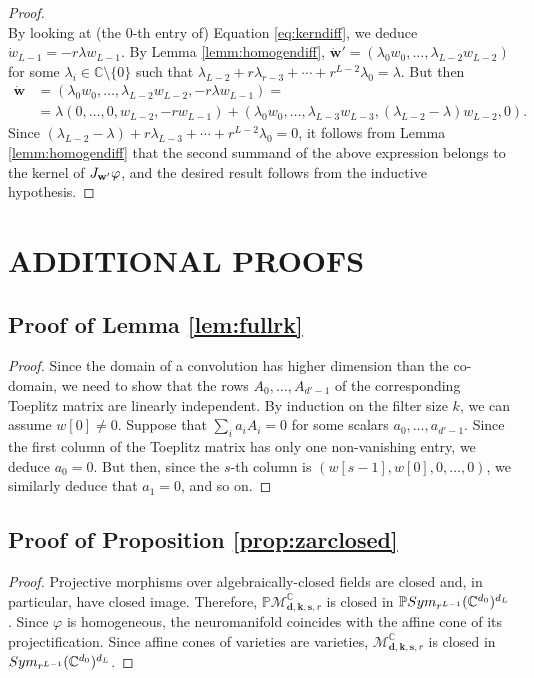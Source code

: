 \documentclass[twoside]{article}
\theoremstyle{plain}%
\theoremstyle{definition}
\theoremstyle{remark}
\newcommand{\symmm}[2]{\textnormal{Sym}_{#1}(#2)}
\begin{document}
\begin{proof}
\begin{equation}
\end{equation}
By looking at (the $0$-th entry of) Equation \ref{eq:kerndiff}, we deduce $\dot{w}_{L-1} = -r \lambda w_{L-1}$. By Lemma \ref{lemm:homogendiff}, $\dot{\mathbf{w}}' = (\lambda_{0}w_{0}, \ldots, \lambda_{L-2}w_{L-2})$ for some $\lambda_i \in \mathbb{C} \setminus \{0\}$ such that $\lambda_{L-2} + r \lambda_{r-3} + \cdots + r^{L-2} \lambda_0 = \lambda$. But then
\begin{align}
\dot{\mathbf{w}} &= (\lambda_0 w_0, \ldots,  \lambda_{L-2}w_{L-2}, -r \lambda w_{L-1}) = \\
&= \lambda (0, \ldots, 0, w_{L-2}, -rw_{L-1}) + (\lambda_{0} w_0, \ldots, \lambda_{L-3}w_{L-3}, (\lambda_{L-2} - \lambda)w_{L-2}, 0).
\end{align}
Since $(\lambda_{L-2} - \lambda) + r \lambda_{L-3} + \cdots + r^{L-2}\lambda_0 = 0$, it follows from Lemma \ref{lemm:homogendiff} that the second summand of the above expression belongs to the kernel of $ \textnormal{J}_\mathbf{w'} \varphi$, and the desired result follows from the inductive hypothesis.
\end{proof}



\section{ADDITIONAL PROOFS}\label{sec:remproof}
\subsection{Proof of Lemma \ref{lem:fullrk}}\label{app:fullrk}
\begin{proof}
Since the domain of a convolution has higher dimension than the co-domain, we need to show that the rows $A_0, \ldots, A_{d'-1}$ of the corresponding Toeplitz matrix are linearly independent. By induction on the filter size $k$, we can assume $w[0] \not = 0$. Suppose that $\sum_i a_i A_i = 0$ for some scalars $a_0, \ldots, a_{d'-1}$. Since the first column of the Toeplitz matrix has only one non-vanishing entry, we deduce $a_0 = 0$. But then, since the $s$-th column is $(w[s-1], w[0], 0, \ldots, 0)$, we similarly deduce that $a_1 = 0$, and so on. 
\end{proof}

\subsection{Proof of Proposition \ref{prop:zarclosed}}\label{app:zarclosed}
\begin{proof}
Projective morphisms over algebraically-closed fields are closed \parencite[II, \S 4, Theorem 4.9]{hartshorne2013algebraic} and, in particular, have closed image. Therefore, $\mathbb{P}\mathcal{M}_{\mathbf{d}, \mathbf{k}, \mathbf{s}, r}^\mathbb{C}$ is closed in $\mathbb{P} \symmm{r^{L-1}}{\mathbb{C}^{d_0}}^{d_L}$. Since $\varphi$ is homogeneous, the neuromanifold coincides with the affine cone of its projectification. Since affine cones of varieties are varieties, $\mathcal{M}_{\mathbf{d}, \mathbf{k}, \mathbf{s}, r}^\mathbb{C}$ is closed in $\symmm{r^{L-1}}{\mathbb{C}^{d_0}}^{d_L}$.     
\end{proof}
\end{document}
